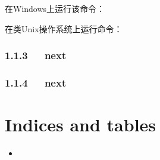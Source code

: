 \documentclass[letterpaper,12pt,english]{sphinxmanual}
\begin{document}
在Windows上运行该命令：

\begin{sphinxVerbatim}[commandchars=\\\{\}]
 
\end{sphinxVerbatim}

在类Unix操作系统上运行命令：

\begin{sphinxVerbatim}[commandchars=\\\{\}]
 
\end{sphinxVerbatim}


\subsection{1.1.3   next}
\label{\detokenize{004.study/001._u7f16_u7a0b/001.make/makefile:next}}

\subsection{1.1.4   next}
\label{\detokenize{004.study/001._u7f16_u7a0b/001.make/makefile:id4}}

\chapter{Indices and tables}
\label{\detokenize{index:indices-and-tables}}\begin{itemize}
\item {} 

\end{itemize}



\renewcommand{\indexname}{索引}
\printindex
\end{document}
